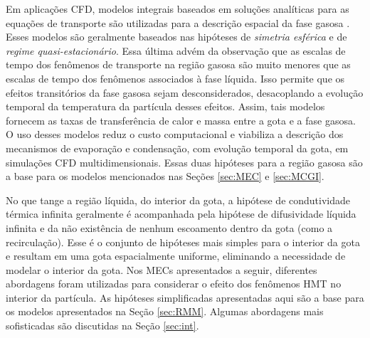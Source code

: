 Em aplicações CFD, modelos integrais baseados em soluções analíticas para as equações de transporte são utilizadas para a descrição espacial da fase gasosa \cite{Sazhin2006}.
Esses modelos são geralmente baseados nas hipóteses de \emph{simetria esférica} e de \emph{regime quasi-estacionário}.
Essa última advém da observação que as escalas de tempo dos fenômenos de transporte na região gasosa são muito menores que as escalas de tempo dos fenômenos associados à fase líquida. Isso permite que os efeitos transitórios da fase gasosa sejam desconsiderados, desacoplando a evolução temporal da temperatura da partícula desses efeitos. 
Assim, tais modelos fornecem as taxas de transferência de calor e massa entre a gota e a fase gasosa.
O uso desses modelos reduz o custo computacional e viabiliza a descrição dos mecanismos de evaporação e condensação, com evolução temporal da gota, em simulações CFD multidimensionais.
Essas duas hipóteses para a região gasosa são a base para os modelos mencionados nas Seções \ref{sec:MEC} e \ref{sec:MCGI}.





No que tange a região líquida, do interior da gota, a hipótese de condutividade térmica infinita geralmente é acompanhada pela hipótese de difusividade líquida infinita e da não existência de nenhum escoamento dentro da gota (como a recirculação).
Esse é o conjunto de hipóteses mais simples para o interior da gota e resultam em uma gota espacialmente uniforme, eliminando a necessidade de modelar o interior da gota.
Nos MECs apresentados a seguir, diferentes abordagens foram utilizadas para considerar o efeito dos fenômenos HMT no interior da partícula.
As hipóteses simplificadas apresentadas aqui são a base para os modelos apresentados na Seção \ref{sec:RMM}.
Algumas abordagens mais sofisticadas são discutidas na Seção \ref{sec:int}.





